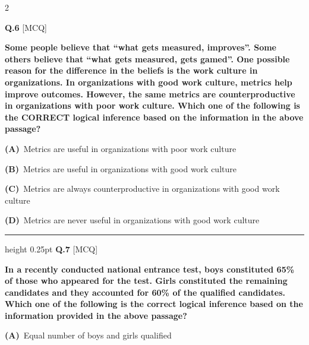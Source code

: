 \documentclass[a4paper,10pt,twoside]{article}
\begin{document}
\begin{multicols}{2}
\vspace{6pt}
\vspace{3pt}

\noindent\textbf{Q.6} \hfill {\footnotesize\textsf{[MCQ]}}
\par\vspace{2pt}
{\bfseries Some people believe that ``what gets measured, improves''. Some others believe that ``what gets measured, gets gamed''. One possible reason for the difference in the beliefs is the work culture in organizations. In organizations with good work culture, metrics help improve outcomes. However, the same metrics are counterproductive in organizations with poor work culture.
Which one of the following is the CORRECT logical inference based on the information in the above passage? \par}
\par\vspace{2pt}\noindent
\textbf{(A)}~Metrics are useful in organizations with poor work culture\par\vspace{2pt}\noindent
\textbf{(B)}~Metrics are useful in organizations with good work culture\par\vspace{2pt}\noindent
\textbf{(C)}~Metrics are always counterproductive in organizations with good work culture\par\vspace{2pt}\noindent
\textbf{(D)}~Metrics are never useful in organizations with good work culture
\par\vspace{6pt}\hrule height 0.25pt\vspace{6pt}
\noindent\textbf{Q.7} \hfill {\footnotesize\textsf{[MCQ]}}
\par\vspace{2pt}
{\bfseries In a recently conducted national entrance test, boys constituted 65\% of those who appeared for the test. Girls constituted the remaining candidates and they accounted for 60\% of the qualified candidates.
Which one of the following is the correct logical inference based on the information provided in the above passage? \par}
\par\vspace{2pt}\noindent
\textbf{(A)}~Equal number of boys and girls qualified\par\vspace{2pt}\noindent

\end{multicols}
\end{document}
